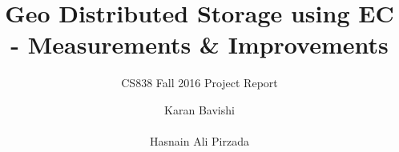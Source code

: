\documentclass{sig-alternate-05-2015}
\begin{document}






%

\title{Geo Distributed Storage using EC - Measurements \& Improvements}
\subtitle{CS838 Fall 2016 Project Report}
%
%
%
%
%

%
\author{
%
%
\alignauthor
Karan Bavishi \\
       \\
\alignauthor
Hasnain Ali Pirzada\\
\\
}
\end{document}
